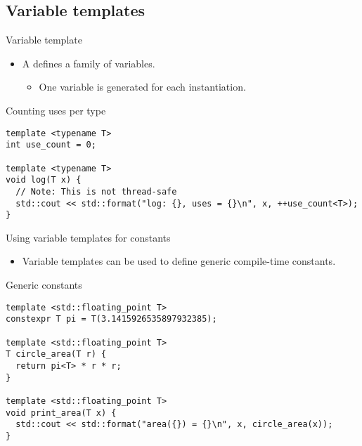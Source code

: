 \subsection{Variable templates}

\begin{frame}[t,fragile]{Variable template}
\begin{itemize}
  \item A  defines a family of variables.
    \begin{itemize}
      \item One variable is generated for each instantiation.
    \end{itemize}
\end{itemize}

\begin{block}{Counting uses per type}
\begin{lstlisting}
template <typename T>
int use_count = 0;

template <typename T>
void log(T x) {
  // Note: This is not thread-safe
  std::cout << std::format("log: {}, uses = {}\n", x, ++use_count<T>);
}
\end{lstlisting}
\end{block}
\end{frame}

\begin{frame}[t,fragile]{Using variable templates for constants}
\begin{itemize}
  \item Variable templates can be used to define generic compile-time constants.
\end{itemize}

\begin{block}{Generic constants}
\begin{lstlisting}
template <std::floating_point T>
constexpr T pi = T(3.1415926535897932385); 

template <std::floating_point T>
T circle_area(T r) {
  return pi<T> * r * r;
}

template <std::floating_point T>
void print_area(T x) {
  std::cout << std::format("area({}) = {}\n", x, circle_area(x));
}
\end{lstlisting}
\end{block}

\end{frame}


